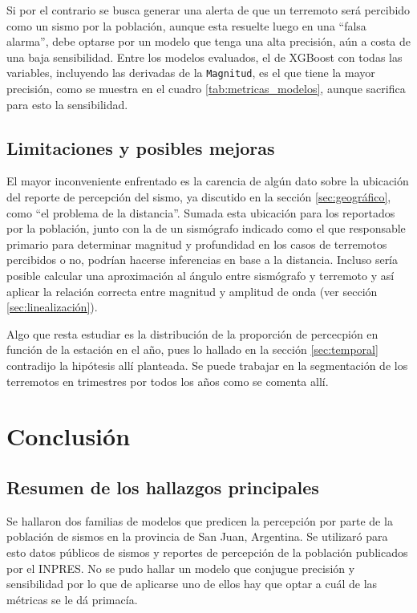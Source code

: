\documentclass[a4paper]{report}
\begin{document}
Si por el contrario se busca generar una alerta de que un terremoto será percibido como un sismo por la población, aunque esta resuelte luego en una ``falsa alarma'', debe optarse por un modelo que tenga una alta precisión, aún a costa de una baja sensibilidad.
Entre los modelos evaluados, el de XGBoost con todas las variables, incluyendo las derivadas de la \verb'Magnitud', es el que tiene la mayor precisión, como se muestra en el cuadro \ref{tab:metricas_modelos}, aunque sacrifica para esto la sensibilidad.




\section{Limitaciones y posibles mejoras}
El mayor inconveniente enfrentado es la carencia de algún dato sobre la ubicación del reporte de percepción del sismo, ya discutido en la sección \ref{sec:geográfico}, como ``el problema de la distancia''.
Sumada esta ubicación para los reportados por la población, junto con la de un sismógrafo indicado como el que responsable primario para determinar magnitud y profundidad en los casos de terremotos percibidos o no, podrían hacerse inferencias en base a la distancia.
Incluso sería posible calcular una aproximación al ángulo entre sismógrafo y terremoto y así aplicar la relación correcta entre magnitud y amplitud de onda (ver sección \ref{sec:linealización}).

Algo que resta estudiar es la distribución de la proporción de percecpión en función de la estación en el año, pues lo hallado en la sección \ref{sec:temporal} contradijo la hipótesis allí planteada.
Se puede trabajar en la segmentación de los terremotos en trimestres por todos los años como se comenta allí. 



\chapter{Conclusión}

\section{Resumen de los hallazgos principales}
Se hallaron dos familias de modelos que predicen la percepción por parte de la población de sismos en la provincia de San Juan, Argentina.
Se utilizaró para esto datos públicos de sismos y reportes de percepción de la población publicados por el INPRES.
No se pudo hallar un modelo que conjugue precisión y sensibilidad por lo que de aplicarse uno de ellos hay que optar a cuál de las métricas se le dá primacía.
\end{document}

